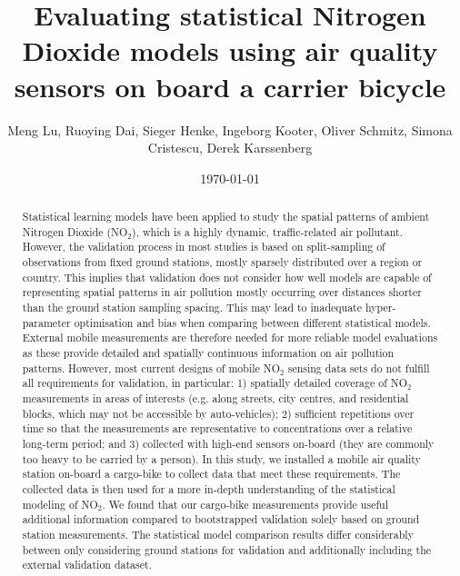 \documentclass{article}
\title{Evaluating statistical Nitrogen Dioxide models using air quality sensors on board a carrier bicycle}
\author{Meng Lu,  Ruoying Dai, Sieger Henke,  Ingeborg Kooter, Oliver Schmitz, Simona Cristescu, Derek Karssenberg}
\date{\today}
\begin{document}
\maketitle

\begin{abstract}
Statistical learning models have been applied to study the spatial patterns of ambient Nitrogen Dioxide (NO$_2$), which is a highly dynamic, traffic-related air pollutant. However, the validation process in most studies is based on split-sampling of observations from fixed ground stations, mostly sparsely distributed over a region or country. This implies that validation does not consider how well models are capable of representing spatial patterns in air pollution mostly occurring over distances shorter than the ground station sampling spacing. This may lead to inadequate hyper-parameter optimisation and bias when comparing between different statistical models. External mobile measurements are therefore needed for more reliable model evaluations as these provide detailed and spatially continuous information on air pollution patterns. However, most current designs of mobile NO$_2$ sensing data sets do not fulfill all requirements for validation, in particular: 1) spatially detailed coverage of NO$_2$ measurements in areas of interests (e.g. along streets, city centres, and residential blocks, which may not be accessible by auto-vehicles); 2) sufficient repetitions over time so that the measurements are representative to concentrations over a relative long-term period; and 3) collected with high-end sensors on-board (they are commonly too heavy to be carried by a person). In this study, we installed a mobile air quality station on-board  a cargo-bike to collect data that meet these requirements. The collected data is then used for a more in-depth understanding of the statistical modeling of NO$_2$. We found that our cargo-bike measurements provide useful additional information compared to bootstrapped validation solely based on ground station measurements. The statistical model comparison results differ considerably between only considering ground stations for validation and additionally including the external validation dataset. 

 
\end{abstract}
\end{document}
